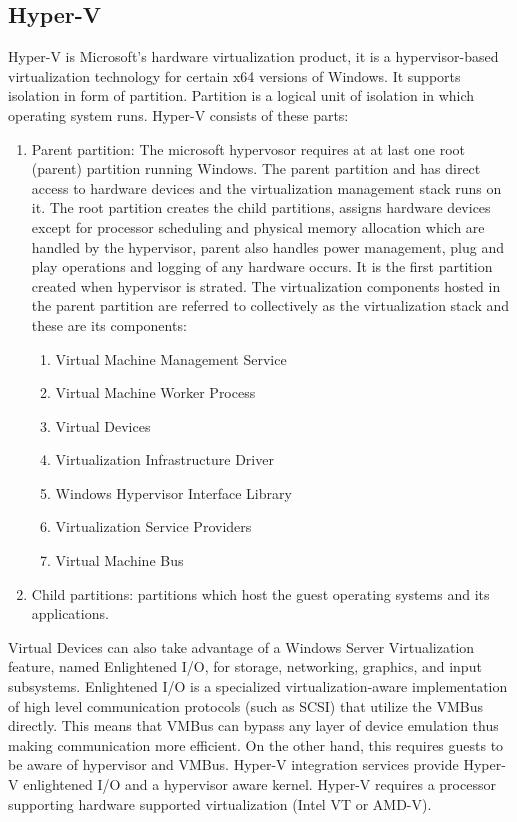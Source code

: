 \subsection{Hyper-V}
Hyper-V is Microsoft's hardware virtualization product, it is a hypervisor-based virtualization technology for certain x64 versions of Windows. It supports isolation in form of partition. Partition is a logical unit of isolation in which operating system runs. 
Hyper-V consists of these parts:
\begin{enumerate}
\item Parent partition: The microsoft hypervosor requires at at last one root (parent) partition running Windows. The parent partition and has direct access to hardware devices and the virtualization management stack runs on it. The root partition creates the child partitions, assigns hardware devices except for processor scheduling and physical memory allocation which are handled by the hypervisor, parent also handles power management, plug and play operations and logging of any hardware occurs. It is the first partition created when hypervisor is strated. The virtualization components hosted in the parent partition are referred to collectively as the virtualization stack and these are its components:
\begin{enumerate}
\item Virtual Machine Management Service
\item Virtual Machine Worker Process
\item Virtual Devices
\item Virtualization Infrastructure Driver
\item Windows Hypervisor Interface Library
\item Virtualization Service Providers
\item Virtual Machine Bus
\end{enumerate}
\item Child partitions: partitions which host the guest operating systems and its applications.
\end{enumerate}
Virtual Devices can also take advantage of a Windows Server Virtualization feature, named Enlightened I/O, for storage, networking, graphics, and input subsystems. Enlightened I/O is a specialized virtualization-aware implementation of high level communication protocols (such as SCSI) that utilize the VMBus directly. This means that VMBus can bypass any layer of device emulation thus making communication more efficient. On the other hand, this requires guests to be aware of hypervisor and VMBus. Hyper-V integration services provide Hyper-V enlightened I/O and a hypervisor aware kernel. Hyper-V requires a processor supporting hardware supported virtualization (Intel VT or AMD-V).
